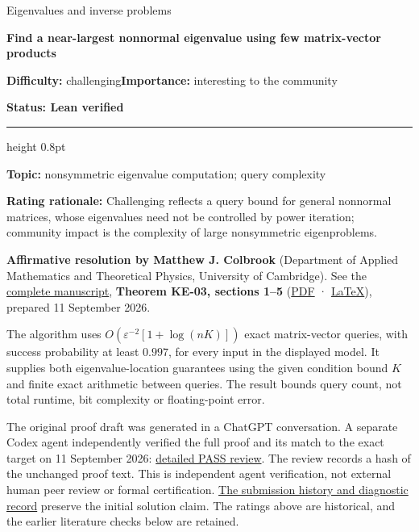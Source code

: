 \documentclass[11pt,a4paper]{article}
\makeatletter
\renewcommand{\subsection}{\Needspace{4\baselineskip}\@startsection{subsection}{2}{0pt}{9pt plus 1pt minus 1pt}{3pt}{\sffamily\bfseries\normalsize\color{ink}}}
\makeatother
\begin{document}
{\sffamily\small\color{muted}Eigenvalues and inverse problems\par}
\vspace{3pt}
{\raggedright{}\sffamily\bfseries\fontsize{21}{24}\selectfont\color{ink}Find
a near-largest nonnormal eigenvalue using few matrix-vector
products\par}
\vspace{7pt}
{\sffamily\small\textbf{Difficulty:} challenging\quad\textbf{Importance:} interesting
to the community\par}
{\sffamily\small\bfseries\color{accent}Status: Lean verified\par}
\vspace{4pt}
{\color{accent}\hrule height 0.8pt}
\vspace{6pt}
\textbf{Topic:} nonsymmetric eigenvalue computation; query complexity

\textbf{Rating rationale:} Challenging reflects a query bound for
general nonnormal matrices, whose eigenvalues need not be controlled by
power iteration; community impact is the complexity of large
nonsymmetric eigenproblems.

\subsection{Resolution --- 2026-09-11}\label{resolution-2026-09-11}

\textbf{Affirmative resolution by Matthew J. Colbrook} (Department of
Applied Mathematics and Theoretical Physics, University of Cambridge).
See the
\href{https://github.com/ajt60gaibb/OpenProblemsInNLA/blob/main/eigenvalues-and-inverse-problems/KE-03/solution.md}{complete
manuscript}, \textbf{Theorem KE-03, sections 1--5}
(\href{https://github.com/ajt60gaibb/OpenProblemsInNLA/blob/main/eigenvalues-and-inverse-problems/KE-03/solution.pdf}{PDF}
·
\href{https://github.com/ajt60gaibb/OpenProblemsInNLA/blob/main/eigenvalues-and-inverse-problems/KE-03/solution.tex}{LaTeX}),
prepared 11 September 2026.

The algorithm uses \(O(\varepsilon^{-2}[1+\log(nK)])\) exact
matrix-vector queries, with success probability at least \(0.997\), for
every input in the displayed model. It supplies both eigenvalue-location
guarantees using the given condition bound \(K\) and finite exact
arithmetic between queries. The result bounds query count, not total
runtime, bit complexity or floating-point error.

The original proof draft was generated in a ChatGPT conversation. A
separate Codex agent independently verified the full proof and its match
to the exact target on 11 September 2026:
\href{https://github.com/ajt60gaibb/OpenProblemsInNLA/blob/main/references/colbrook-2026-09-11/verification/reviews/KE-03-review.md}{detailed
PASS review}. The review records a hash of the unchanged proof text.
This is independent agent verification, not external human peer review
or formal certification.
\href{https://github.com/ajt60gaibb/OpenProblemsInNLA/blob/main/references/colbrook-2026-09-11/README.md}{The
submission history and diagnostic record} preserve the initial solution
claim. The ratings above are historical, and the earlier literature
checks below are retained.
\end{document}
